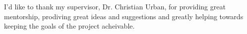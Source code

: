 I'd like to thank my supervisor, Dr. Christian Urban, for providing great mentorship, prodiving
great ideas and suggestions and greatly helping towards keeping the goals of the project acheivable.
